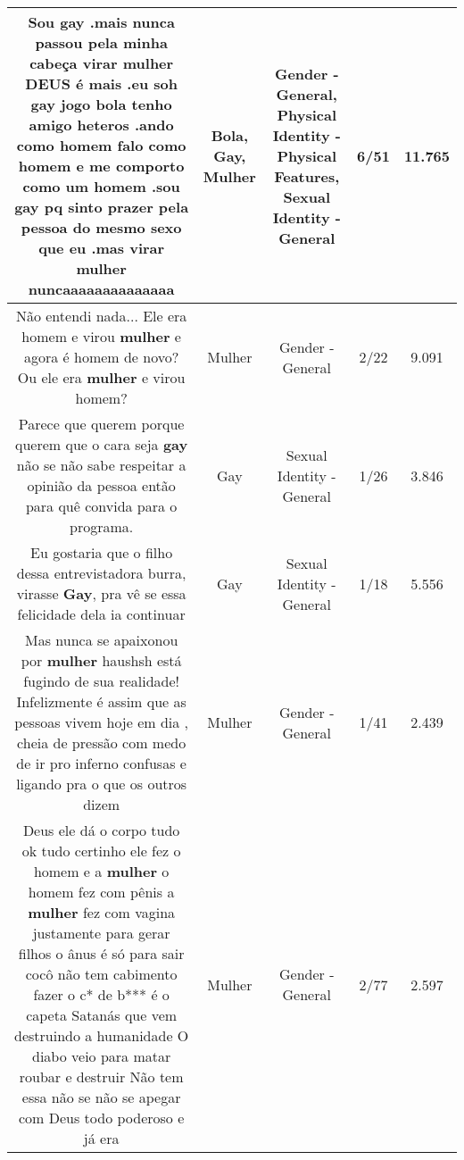 \documentclass[11pt]{article}
\newlength\mylength
\begin{document}
\begin{center}
\begin{longtable}{|C{.65\mylength}|C{.30\mylength}|C{.12\mylength}|C{.12\mylength}|C{.12\mylength}|}
  \small Sou \textbf{gay} .mais nunca passou pela minha cabeça virar \textbf{mulher} DEUS é mais .eu soh \textbf{gay} jogo \textbf{bola} tenho amigo heteros .ando como homem falo como homem e me comporto como um homem .sou \textbf{gay} pq sinto prazer pela pessoa do mesmo sexo que eu .mas virar \textbf{mulher} nuncaaaaaaaaaaaaaa\normalsize   & Bola, Gay, Mulher & Gender - General, Physical Identity - Physical Features, Sexual Identity - General & 6/51 & 11.765 \\  \hline
  \small Não entendi nada... Ele era homem e virou \textbf{mulher} e agora é homem de novo? Ou ele era \textbf{mulher} e virou homem?\normalsize   & Mulher & Gender - General & 2/22 & 9.091 \\  \hline
  \small Parece que querem porque querem que o cara seja \textbf{gay} não se não sabe respeitar a opinião da pessoa então para quê convida para o programa.\normalsize   & Gay & Sexual Identity - General & 1/26 & 3.846 \\  \hline
  \small Eu gostaria que o filho dessa entrevistadora burra, virasse \textbf{Gay}, pra vê se essa felicidade dela ia continuar\normalsize   & Gay & Sexual Identity - General & 1/18 & 5.556 \\  \hline
  \small Mas nunca se apaixonou por \textbf{mulher} haushsh está fugindo de sua realidade! Infelizmente é assim que as pessoas vivem hoje em dia , cheia de pressão com medo de ir pro inferno confusas e ligando pra o que os outros dizem\normalsize   & Mulher & Gender - General & 1/41 & 2.439 \\  \hline
  \small Deus ele dá o corpo tudo ok tudo certinho ele fez o homem e a \textbf{mulher} o homem fez com pênis a \textbf{mulher} fez com vagina justamente para gerar filhos o ânus é só para sair cocô não tem cabimento fazer o c* de b*** é o capeta Satanás que vem destruindo a humanidade O diabo veio para matar roubar e destruir Não tem essa não se não se apegar com Deus todo poderoso e já era\normalsize   & Mulher & Gender - General & 2/77 & 2.597 \\  \hline

\end{longtable}
\end{center}
\end{document}
